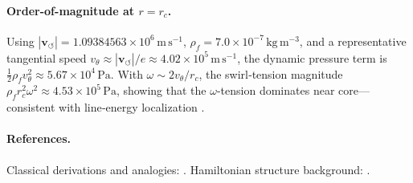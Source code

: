 \documentclass[10pt,reprint,aps,onecolumn,nofootinbib]{revtex4-2}
\begin{document}
    \paragraph{Order-of-magnitude at \(r\!=\!r_c\).}
        Using
        \(|\mathbf{v}_{\!\boldsymbol{\circlearrowleft}}|=1.09384563\times10^{6}\,\mathrm{m\,s^{-1}}\),
        \(\rho_{\!f}=7.0\times10^{-7}\,\mathrm{kg\,m^{-3}}\),
        and a representative tangential speed \(v_\theta \approx |\mathbf{v}_{\!\boldsymbol{\circlearrowleft}}|/e \approx 4.02\times10^{5}\,\mathrm{m\,s^{-1}}\),
        the dynamic pressure term is
        \(\tfrac12 \rho_{\!f}v_\theta^{2}\approx 5.67\times10^{4}\,\mathrm{Pa}\).
        With \(\omega\sim 2v_\theta/r_c\),
        the swirl‐tension magnitude \(\rho_{\!f} r_c^{2}\omega^{2}\approx 4.53\times10^{5}\,\mathrm{Pa}\),
        showing that the \(\omega\)-tension dominates near core—consistent with line‐energy localization
        \cite{Saffman1992,Batchelor1967,LandauFM}.

    \paragraph{References.}
        Classical derivations and analogies: \cite{Saffman1992,Batchelor1967,LandauFM}.
        Hamiltonian structure background: \cite{Salmon1988,Morrison1998}.
\end{document}
